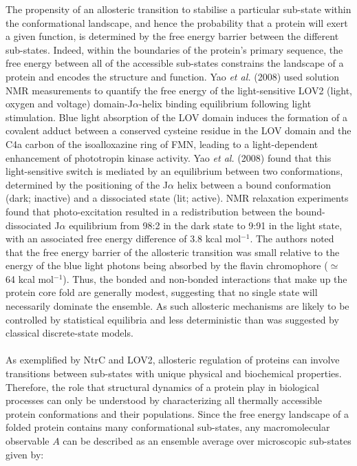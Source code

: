 %
%
The propensity of an allosteric transition to stabilise a particular sub-state within the conformational landscape, and hence the probability that a protein will exert a given function, is determined by the free energy barrier between the different sub-states. Indeed, within the boundaries of the protein's primary sequence, the free energy between all of the accessible sub-states constrains the landscape of a protein and encodes the structure and function. Yao \textit{et al.} (2008) \cite{Yao:2008aa} used solution NMR measurements to quantify the free energy of the light-sensitive LOV2 (light, oxygen and voltage) domain-J$\alpha$-helix binding equilibrium following light stimulation. Blue light absorption of the LOV domain induces the formation of a covalent adduct between a conserved cysteine residue in the LOV domain and the C4a carbon of the isoalloxazine ring of FMN, leading to a light-dependent enhancement of phototropin kinase activity. Yao \textit{et al.} (2008) \cite{Yao:2008aa} found that this light-sensitive switch is mediated by an equilibrium between two conformations, determined by the positioning of the J$\alpha$ helix between a bound conformation (dark; inactive) and a dissociated state (lit; active). NMR relaxation experiments found that photo-excitation resulted in a redistribution between the bound-dissociated J$\alpha$ equilibrium from 98:2 in the dark state to 9:91 in the light state, with an associated free energy difference of 3.8 kcal mol$^{-1}$. The authors noted that the free energy barrier of the allosteric transition was small relative to the energy of the blue light photons being absorbed by the flavin chromophore ($\simeq$ 64 kcal mol$^{-1}$). Thus, the bonded and non-bonded interactions that make up the protein core fold are generally modest, suggesting that no single state will necessarily dominate the ensemble. As such allosteric mechanisms are likely to be controlled by statistical equilibria and less deterministic than was suggested by classical discrete-state models. 
%
%
\\\\
%
%
As exemplified by NtrC and LOV2, allosteric regulation of proteins can involve transitions between sub-states with unique physical and biochemical properties. Therefore, the role that structural dynamics of a protein play in biological processes can only be understood by characterizing all thermally accessible protein conformations and their populations. Since the free energy landscape of a folded protein contains many conformational sub-states, any macromolecular observable $A$ can be described as an ensemble average over microscopic sub-states given by:
